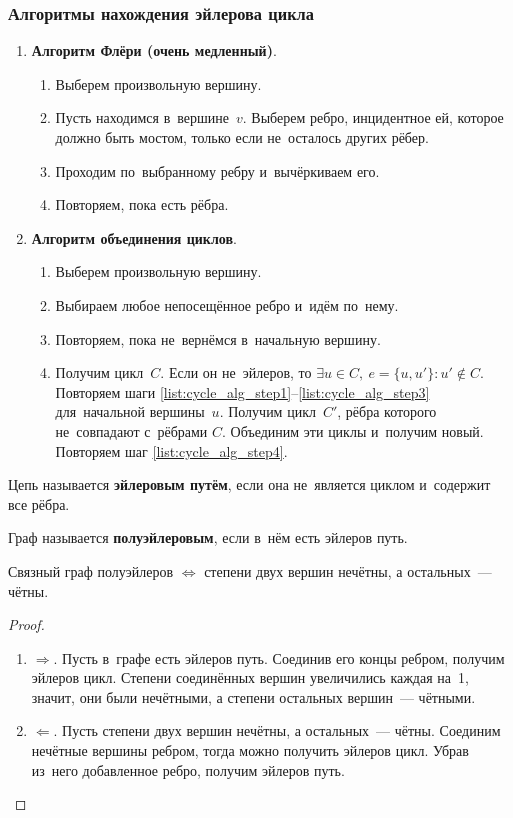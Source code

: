 \subsubsection{Алгоритмы нахождения эйлерова цикла}
\begin{enumerate}
	\item\textbf{Алгоритм Флёри (очень медленный)}.
	\begin{enumerate}
		\item Выберем произвольную вершину.
		\item Пусть находимся в~вершине~$v$.
		Выберем ребро, инцидентное ей, которое должно быть мостом, только если не~осталось других рёбер.
		\item Проходим по~выбранному ребру и~вычёркиваем его.
		\item Повторяем, пока есть рёбра.
	\end{enumerate}
	\item\textbf{Алгоритм объединения циклов}.
	\begin{enumerate}
		\item\label{list:cycle_alg_step1} Выберем произвольную вершину.
		\item Выбираем любое непосещённое ребро и~идём по~нему.
		\item\label{list:cycle_alg_step3} Повторяем, пока не~вернёмся в~начальную вершину.
		\item\label{list:cycle_alg_step4} Получим цикл~$C$.
		Если он не~эйлеров, то $\exists u \in C, \ e = \{ u, u' \} \colon u' \notin C$.
		Повторяем шаги \ref{list:cycle_alg_step1}--\ref{list:cycle_alg_step3} для~начальной вершины~$u$.
		Получим цикл~$C'$, рёбра которого не~совпадают с~рёбрами $C$.
		Объединим эти циклы и~получим новый.
		Повторяем шаг \ref{list:cycle_alg_step4}.
	\end{enumerate}
\end{enumerate}

Цепь называется \textbf{эйлеровым путём}, если она не~является циклом и~содержит все рёбра.

Граф называется \textbf{полуэйлеровым}, если в~нём есть эйлеров путь.

\begin{theorem}
Связный граф полуэйлеров $\Leftrightarrow$ степени двух вершин нечётны, а остальных~--- чётны.
\end{theorem}
\begin{proof}
\begin{enumerate}
	\item $\Rightarrow$. Пусть в~графе есть эйлеров путь.
	Соединив его концы ребром, получим эйлеров цикл.
	Степени соединённых вершин увеличились каждая на~1, значит, они были нечётными, а степени остальных вершин~--- чётными.
	\item $\Leftarrow$. Пусть степени двух вершин нечётны, а остальных~--- чётны.
	Соединим нечётные вершины ребром, тогда можно получить эйлеров цикл.
	Убрав из~него добавленное ребро, получим эйлеров путь.
\end{enumerate}
\end{proof}